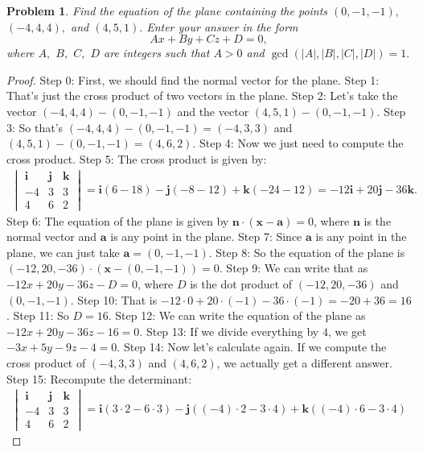 \documentclass{article}
\newtheorem{theorem}{Problem}
\begin{document}
\begin{theorem}
Find the equation of the plane containing the points $(0,-1,-1),$ $(-4,4,4),$ and $(4,5,1).$ Enter your answer in the form \[Ax + By + Cz + D = 0,\]where $A,$ $B,$ $C,$ $D$ are integers such that $A > 0$ and $\gcd(|A|,|B|,|C|,|D|) = 1.$
\end{theorem}

\begin{proof}
Step 0: First, we should find the normal vector for the plane.
Step 1: That's just the cross product of two vectors in the plane.
Step 2: Let's take the vector $(-4,4,4) - (0,-1,-1)$ and the vector $(4,5,1) - (0,-1,-1)$.
Step 3: So that's $(-4,4,4) - (0,-1,-1) = (-4,3,3)$ and $(4,5,1) - (0,-1,-1) = (4,6,2)$.
Step 4: Now we just need to compute the cross product.
Step 5: The cross product is given by: \begin{align*} \begin{vmatrix} \mathbf{i} & \mathbf{j} & \mathbf{k} \\ -4 & 3 & 3 \\ 4 & 6 & 2 \end{vmatrix} = \mathbf{i}(6-18) - \mathbf{j}(-8-12) + \mathbf{k}(-24-12) = -12\mathbf{i} + 20\mathbf{j} - 36\mathbf{k}. \end{align*}
Step 6: The equation of the plane is given by $\mathbf{n}\cdot(\mathbf{x} - \mathbf{a}) = 0$, where $\mathbf{n}$ is the normal vector and $\mathbf{a}$ is any point in the plane.
Step 7: Since $\mathbf{a}$ is any point in the plane, we can just take $\mathbf{a} = (0,-1,-1)$.
Step 8: So the equation of the plane is $(-12, 20, -36)\cdot(\mathbf{x} - (0,-1,-1)) = 0$.
Step 9: We can write that as $-12x + 20y - 36z - D = 0$, where $D$ is the dot product of $(-12, 20, -36)$ and $(0,-1,-1)$.
Step 10: That is $-12\cdot 0 + 20\cdot (-1) - 36\cdot (-1) = -20 + 36 = 16$.
Step 11: So $D = 16$.
Step 12: We can write the equation of the plane as $-12x + 20y - 36z - 16 = 0$.
Step 13: If we divide everything by $4$, we get $-3x + 5y - 9z - 4 = 0$.
Step 14: Now let's calculate again. If we compute the cross product of $(-4,3,3)$ and $(4,6,2)$, we actually get a different answer.
Step 15: Recompute the determinant: \begin{align*} \begin{vmatrix} \mathbf{i} & \mathbf{j} & \mathbf{k} \\ -4 & 3 & 3 \\ 4 & 6 & 2 \end{vmatrix} = \mathbf{i}(3\cdot2 - 6\cdot3) - \mathbf{j}((-4)\cdot2 - 3\cdot4) + \mathbf{k}((-4)\cdot6 - 3\cdot4) \end{align*}

\end{proof}
\end{document}
